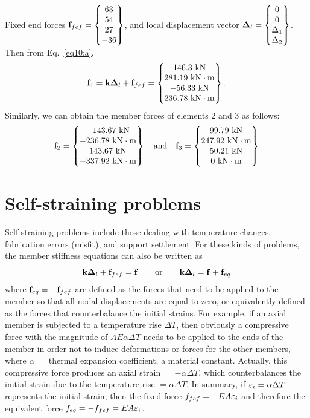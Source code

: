 \begin{example}
\begin{fig}
  
\end{fig}
Fixed end forces $\mathbf{f}_{fef} = \begin{Bmatrix}63\\ 54\\ 27\\ -36\end{Bmatrix}$, and local displacement vector $\bm{\Delta}_l = \begin{Bmatrix}0\\ 0\\ \Delta_1\\ \Delta_2\end{Bmatrix}$. Then from Eq.~\eqref{eq10:a},
\begin{equation*}
  \mathbf{f}_1 = \mathbf{k}\bm{\Delta}_l + \mathbf{f}_{fef} = \begin{Bmatrix}146.3\text{ kN}\\ 281.19\text{ kN}\cdot\text{m}\\ -56.33\text{ kN}\\ 236.78\text{ kN}\cdot\text{m}\end{Bmatrix}.
\end{equation*}
Similarly, we can obtain the member forces of elements 2 and 3 as follows:
\begin{equation*}
  \mathbf{f}_2 = \begin{Bmatrix}-143.67\text{ kN}\\ -236.78\text{ kN}\cdot\text{m}\\ 143.67\text{ kN}\\ -337.92\text{ kN}\cdot\text{m}\end{Bmatrix}
  \quad\text{and}\quad
  \mathbf{f}_3 = \begin{Bmatrix}99.79\text{ kN}\\ 247.92\text{ kN}\cdot\text{m}\\ 50.21\text{ kN}\\ 0\text{ kN}\cdot\text{m}\end{Bmatrix}
\end{equation*}
\end{example}

\section{Self-straining problems}
Self-straining problems include those dealing with temperature changes, fabrication errors (misfit), and support settlement. For these kinds of problems, the member stiffness equations can also be written as
\begin{equation}
  \mathbf{k}\bm{\Delta}_l + \mathbf{f}_{fef} = \mathbf{f}\qquad\text{or}\qquad \mathbf{k}\bm{\Delta}_l = \mathbf{f} + \mathbf{f}_{eq}
\end{equation}
where $\mathbf{f}_{eq} = -\mathbf{f}_{fef}$ are defined as the forces that need to be applied to the member so that all nodal displacements are equal to zero, or equivalently defined as the forces that counterbalance the initial strains. For example, if an axial member is subjected to a temperature rise $\Delta T$, then obviously a compressive force with the magnitude of $AE\alpha\Delta T$ needs to be applied to the ends of the member in order not to induce deformations or forces for the other members, where $\alpha =$ thermal expansion coefficient, a material constant. Actually, this compressive force produces an axial strain $= -\alpha\Delta T$, which counterbalances the initial strain due to the temperature rise $= \alpha\Delta T$. In summary, if $\varepsilon_i = \alpha\Delta T$ represents the initial strain, then the fixed-force $f_{fef} = -EA\varepsilon_i$ and therefore the equivalent force $f_{eq} = -f_{fef} = EA\varepsilon_i$.

